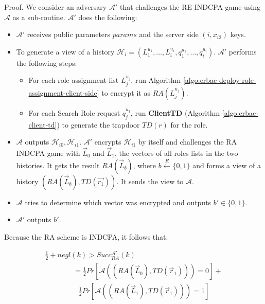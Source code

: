 \documentclass[epsfig,a4paper,11pt,titlepage]{book}
\numberwithin{algorithm}{chapter}
\begin{document}
Proof. We consider an adversary $\mathcal{A}'$ that challenges the RE \gls{INDCPA} game using $\mathcal{A}$ as a sub-routine. $\mathcal{A}'$ does the following:
\begin{itemize}
\item $\mathcal{A}'$ receives public parameters $params$ and the server side $(i, x_{i2})$ keys. 

\item To generate a view of a history $\mathcal{H}_i=(L_1^{u_1}, \ldots, L_i^{u_i}, q_1^{u_1}, \ldots, q_i^{u_i})$. $\mathcal{A}'$ performs the following steps:
\begin{itemize}
\item For each role assignment list $L_j^{u_j}$, run Algorithm \ref{algo:erbac-deploy-role-assignment-client-side} to encrypt it as $RA(L_j^{u_j})$. 
\item For each Search Role request $q_j^{u_j}$, run \textbf{ClientTD} (Algorithm \ref{algo:erbac-client-td}) to generate the trapdoor $TD(r)$ for the role.
\end{itemize}

\item $\mathcal{A}$ outputs $\mathcal{H}_{i0},\mathcal{H}_{i1}$. $\mathcal{A}'$ encrypts $\mathcal{H}_{i1}$ by itself and challenges the \gls{RA} \gls{INDCPA} game with $\vec{L}_0$ and $\vec{L}_1$, the vectors of all roles lists in the two histories. It gets the result $RA(\vec{L}_b)$, where $b \xleftarrow{R} \{0,1\}$ and forms a view of a history $(RA(\vec{L}_b), TD(\vec{r_1}))$. It sends the view to $\mathcal{A}$.

\item $\mathcal{A}$ tries to determine which vector was encrypted and outputs $b' \in \{0,1\}$.

\item $\mathcal{A'}$ outputs $b'$.

\end{itemize}

Because the \gls{RA} scheme is \gls{INDCPA}, it follows that:

\begin{equation}
\begin{array}{l}
\frac{1}{2} + negl(k)  >  Succ_{RA}^{\mathcal{A}'}(k) \\
\hspace{47pt} = \frac{1}{2} Pr[\mathcal{A}((RA(\vec{L}_0), TD(\vec{r}_1))) = 0] + \\
\hspace{56pt} \frac{1}{2} Pr[\mathcal{A}((RA(\vec{L}_1), TD(\vec{r}_1))) = 1]
\end{array}
\end{equation}
\end{document}
